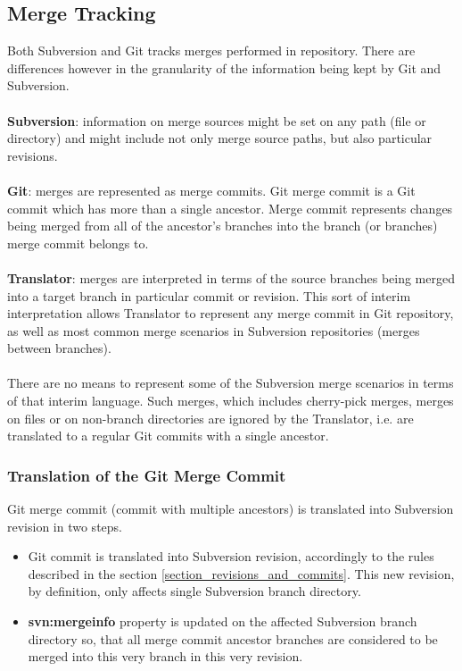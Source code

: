 \renewcommand{\figurename}{Diagram}
\subsection{Merge Tracking}

Both Subversion and Git tracks merges performed in repository. There are differences however in 
the granularity of the information being kept by Git and Subversion.
\\\\
\textbf{Subversion}: information on merge sources might be set on any path (file or directory) and might include not only
merge source paths, but also particular revisions.
\\\\
\textbf{Git}: merges are represented as merge commits. Git merge commit is a Git commit which has more than a single 
ancestor. Merge commit represents changes being merged from all of the ancestor's branches into the branch (or branches)
merge commit belongs to.
\\\\
\textbf{Translator}: merges are interpreted in terms of the source branches being merged into a 
target branch in particular commit or revision. This sort of interim interpretation allows Translator
to represent any merge commit in Git repository, as well as most common merge scenarios in Subversion repositories (merges
between branches).
\\\\
There are no means to represent some of the Subversion merge scenarios in terms of that interim language.
Such merges, which includes cherry-pick merges, merges on files or on non-branch directories are ignored by the Translator,
i.e. are translated to a regular Git commits with a single ancestor.

\subsubsection{Translation of the Git Merge Commit}

Git merge commit (commit with multiple ancestors) is translated into Subversion revision in two steps.
\begin{itemize}
\item Git commit is translated into Subversion revision, accordingly to the rules described in the section \ref{section_revisions_and_commits}.
This new revision, by definition, only affects single Subversion branch directory.
\item \textbf{svn:mergeinfo} property is updated on the affected Subversion branch directory so, that all merge
commit ancestor branches are considered to be merged into this very branch in this very revision.
\end{itemize}

